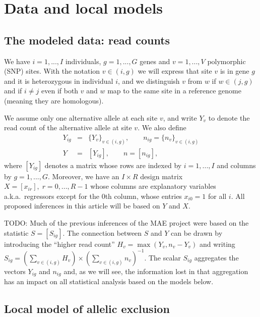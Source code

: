 \documentclass[letterpaper]{article}
\begin{document}
\section{Data and local models}

\subsection{The modeled data: read counts}

We have \(i=1,...,I\) individuals, \(g=1,...,G\) genes and \(v=1,...,V\)
polymorphic (SNP) sites.  With the notation \(v\in(i,g)\) we will express that site \(v\) is in
gene \(g\) and it is heterozygous in individual \(i\), and we distinguish \(v\)
from \(w\) if \(w\in(j,g)\) and if \(i\neq j\) even if both \(v\) and \(w\) map to
the same site in a reference genome (meaning they are homologous).

We assume only one alternative allele at each site \(v\), and write \(Y_v\) to
denote the read count of the alternative allele at site \(v\).  We also define 
\begin{eqnarray}
\label{eq:Y-ig-def}
Y_{ig} &=&  \{Y_v\}_{v\in(i,g)}, \qquad n_{ig} = \{n_v\}_{v\in(i,g)} \\
\label{eq:Y-def}
Y &=&  [Y_{ig}], \qquad n = [n_{ig}],
\end{eqnarray}
where \([Y_{ig}]\) denotes a matrix whose rows are indexed by \(i=1,...,I\)
and columns by \(g=1,...,G\).  Moreover, we have an \(I\times R\) design matrix \(X =
[x_{ir}], \; r=0,...,R-1\) whose columns are explanatory variables
a.k.a.~regressors except for the 0th column, whose entries \(x_{i0}=1\)
for all \(i\). All
proposed inferences in this article will be based on \(Y\) and \(X\).

TODO:
Much of the previous inferences of the MAE project were based on the statistic
\(S = [S_{ig}]\). The connection between \(S\) and \(Y\) can be drawn by
introducing the ``higher read count'' \(H_{v} = \max(Y_v, n_v-Y_v)\) and
writing \(S_{ig} = \left( \sum_{v\in(i,g)} H_v \right) \times \left(
\sum_{v\in(i,g)} n_v \right)^{-1}\).  The scalar \(S_{ig}\) aggregates the
vectors \(Y_{ig}\) and \(n_{ig}\) and, as we will see, the information lost in
that aggregation has an impact on all statistical analysis based on the models
below.

\subsection{Local model of allelic exclusion}
\label{sec:local-model}
\end{document}
